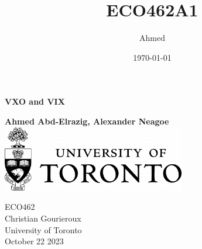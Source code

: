 \documentclass[12pt, a4paper]{article}
\title{ECO462A1}
\author{Ahmed }
\date{\today}
\theoremstyle{definition}
\begin{document}
	
	\begin{titlepage}
		\begin{center}
			\vspace*{1cm}
			
			\huge \textbf{VXO and VIX}
			
			\vspace{0.5cm}

			
			\vspace{1.5cm}
			
			\small \textbf{Ahmed Abd-Elrazig, Alexander Neagoe}\\
			\vspace{5cm}
			\includegraphics[width=0.6\textwidth]{UofT.png}
			\vspace{5cm}
			
			ECO462\\
			Christian Gourieroux\\
			University of Toronto\\
			October 22 2023
			
		\end{center}
	\end{titlepage}
\end{document}
